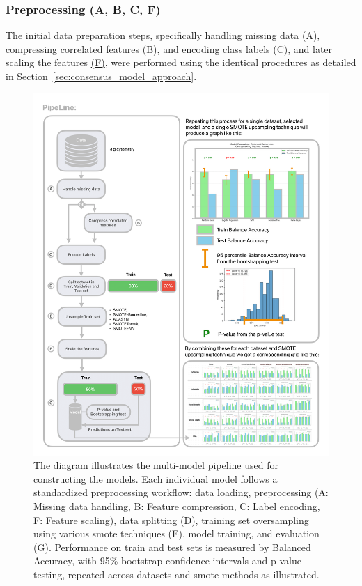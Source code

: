 \documentclass[12pt,a4paper]{report}
\begin{document}
\subsubsection{Preprocessing \hyperref[fig:pipeline-2]{(A, B, C, F)}}
\noindent The initial data preparation steps, specifically handling missing data \hyperref[fig:pipeline-2]{(A)}, compressing correlated features \hyperref[fig:pipeline-2]{(B)}, and encoding class labels \hyperref[fig:pipeline-2]{(C)}, and later scaling the features \hyperref[fig:pipeline-2]{(F)}, were performed using the identical procedures as detailed in Section~\ref{sec:consensus_model_approach}.


\pagebreak
\begin{figure}[H]
  \centering
  \hspace*{-0.9cm} %
  \includegraphics[width=1.1\textwidth]{images/Pipeline-2.png} %
  \caption[Feature Identification models pipeline diagram]{ The diagram illustrates the multi-model pipeline used for constructing the models.  Each individual model follows a standardized preprocessing workflow: data loading, preprocessing (A: Missing data handling, B: Feature compression, C: Label encoding, F: Feature scaling), data splitting (D), training set oversampling using various \gls{smote} techniques (E), model training, and evaluation (G). Performance on train and test sets is measured by Balanced Accuracy, with 95\% bootstrap confidence intervals and p-value testing, repeated across datasets and \gls{smote} methods as illustrated.}
  \label{fig:pipeline-2}
\end{figure}
\end{document}
